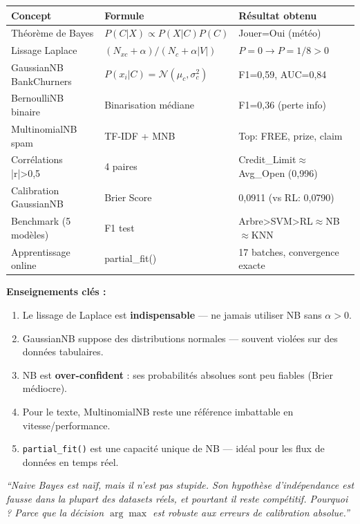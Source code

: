 \documentclass[12pt,a4paper]{article}
\begin{document}
\begin{tcolorbox}[enhanced,breakable,colback=darkblue!5,colframe=darkblue,
  title={\textbf{Bilan du TD 7 — Naive Bayes \& Raisonnement Bayésien}},
  fonttitle=\bfseries\normalsize\color{white},colbacktitle=darkblue,boxrule=1pt]
\renewcommand{\arraystretch}{1.2}
\begin{center}
\begin{tabular}{p{3.5cm} p{4.5cm} p{5cm}}
\toprule
\textbf{Concept} & \textbf{Formule} & \textbf{Résultat obtenu} \\
\midrule
Théorème de Bayes & $P(C|X) \propto P(X|C) P(C)$ & Jouer=Oui (météo) \\
Lissage Laplace & $(N_{xc}+\alpha)/(N_c+\alpha|V|)$ & $P=0 \to P=1/8 > 0$ \\
GaussianNB BankChurners & $P(x_i|C) = \mathcal{N}(\mu_c,\sigma_c^2)$ & F1=0{,}59, AUC=0{,}84 \\
BernoulliNB binaire & Binarisation médiane & F1=0{,}36 (perte info) \\
MultinomialNB spam & TF-IDF + MNB & Top: FREE, prize, claim \\
Corrélations |r|>0{,}5 & 4 paires & Credit\_Limit$\approx$Avg\_Open (0{,}996) \\
Calibration GaussianNB & Brier Score & 0{,}0911 (vs RL: 0{,}0790) \\
Benchmark (5 modèles) & F1 test & Arbre>SVM>RL$\approx$NB$\approx$KNN \\
Apprentissage online & partial\_fit() & 17 batches, convergence exacte \\
\bottomrule
\end{tabular}
\end{center}
\medskip
\textbf{Enseignements clés :}
\begin{enumerate}[leftmargin=2em]
  \item Le lissage de Laplace est \textbf{indispensable} — ne jamais utiliser NB sans $\alpha > 0$.
  \item GaussianNB suppose des distributions normales — souvent violées sur des données tabulaires.
  \item NB est \textbf{over-confident} : ses probabilités absolues sont peu fiables (Brier médiocre).
  \item Pour le texte, MultinomialNB reste une référence imbattable en vitesse/performance.
  \item \texttt{partial\_fit()} est une capacité unique de NB — idéal pour les flux de données en temps réel.
\end{enumerate}
\end{tcolorbox}

\vspace{1em}
\begin{center}
\begin{tcolorbox}[enhanced,width=0.78\textwidth,colback=bayespurple!8,colframe=bayespurple,boxrule=0.8pt,arc=4pt]
\centering\small\itshape
``Naive Bayes est naïf, mais il n'est pas stupide. Son hypothèse d'indépendance est fausse
dans la plupart des datasets réels, et pourtant il reste compétitif. Pourquoi ?
Parce que la décision $\arg\max$ est robuste aux erreurs de calibration absolue.''
\end{tcolorbox}
\end{center}
\end{document}
